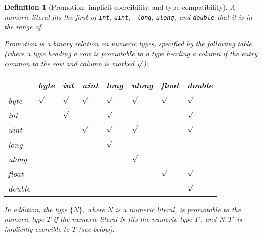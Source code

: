 \makeatletter{}\documentclass[10pt,oneside]{book}
\theoremstyle{note}
\newtheorem{definition}{Definition}[section]
\begin{document}
\begin{definition}[Promotion, implicit coercibility, and type compatibility]

A numeric literal fits the first of {\tt int}, {\tt uint}, {\tt
  long}, {\tt ulong}, and {\tt double} that it is in the range of.

Promotion is a binary relation on numeric types, specified by the following
  table (where a type heading a row is promotable to a type heading a
  column if the entry common to the row and column is marked $\surd$):
\begin{center}
\begin{tabular}{| l | l | l | l | l | l | l | l |}
\hline
      & byte & int & uint & long & ulong & float & double \\ 
\hline
  byte    & $\surd$ & $\surd$ & $\surd$ & $\surd$ & $\surd$ & $\surd$ & $\surd$  \\
\hline
  int     & & $\surd$ & & $\surd$ & & & $\surd$  \\
\hline
  uint     & & & $\surd$ & $\surd$ & $\surd$ & & $\surd$  \\
\hline 
  long      & & & & $\surd$ & & & \\
\hline 
  ulong      & & & & & $\surd$ & &  \\
\hline 
  float      & & & & & & $\surd$ & $\surd$  \\
\hline 
  double      & & & & & & & $\surd$  \\
\hline
\end{tabular}
\end{center} 

In addition, the type $\{N\}$, where $N$ is a numeric literal, is promotable to the numeric type $T$ if
the numeric literal $N$ fits the numeric type $T'$, and $N: T'$ is implicitly
coercible to $T$ (see below).
 

\end{definition}
\end{document}
